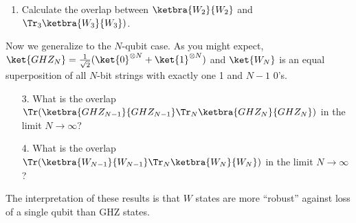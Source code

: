 \begin{exercises}
\begin{enumerate}
\item Calculate the overlap between  $\ketbra{W_2}{W_2}$ and $\Tr_3\ketbra{W_3}{W_3})$.
\end{enumerate}
Now we generalize to the $N$-qubit case. As you might expect, $\ket{GHZ_N}=\frac{1}{\sqrt{2}} (\ket{0}^{\otimes N}+\ket{1}^{\otimes N})$ and $\ket{W_N}$ is an equal superposition of all $N$-bit strings with exactly one 1 and $N-1$ 0's.
\begin{enumerate}
\item[3.] What is the overlap $\Tr(\ketbra{GHZ_{N-1}}{GHZ_{N-1}} \Tr_N\ketbra{GHZ_N}{GHZ_N})$ in the limit $N \rightarrow \infty$?
\item[4.] What is the overlap $\Tr(\ketbra{W_{N-1}}{W_{N-1}} \Tr_N\ketbra{W_N}{W_N})$ in the limit $N \rightarrow \infty$?
\end{enumerate}
The interpretation of these results is that $W$ states are more ``robust'' against loss of a single qubit than GHZ states.
\end{exercises}
